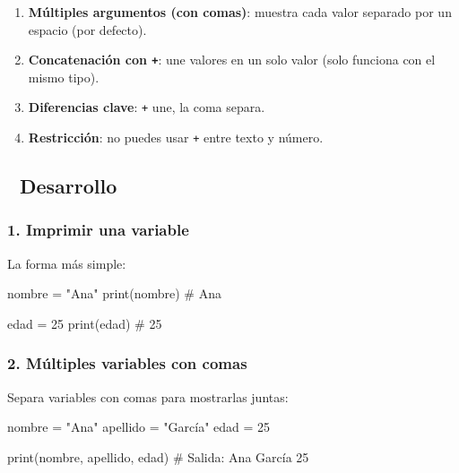 \documentclass[
  doc,
  floatsintext,
  longtable,
  a4paper,
  nolmodern,
  notxfonts,
  notimes,
  12pt,
  colorlinks=true,linkcolor=blue,citecolor=blue,urlcolor=blue]{apa7}
\newenvironment{Shaded}{\begin{snugshade}}{\end{snugshade}}
\newcommand{\BuiltInTok}[1]{\textcolor[rgb]{0.00,0.23,0.31}{#1}}
\newcommand{\CommentTok}[1]{\textcolor[rgb]{0.37,0.37,0.37}{#1}}
\newcommand{\DecValTok}[1]{\textcolor[rgb]{0.68,0.00,0.00}{#1}}
\newcommand{\NormalTok}[1]{\textcolor[rgb]{0.00,0.23,0.31}{#1}}
\newcommand{\OperatorTok}[1]{\textcolor[rgb]{0.37,0.37,0.37}{#1}}
\newcommand{\StringTok}[1]{\textcolor[rgb]{0.13,0.47,0.30}{#1}}
\providecommand{\tightlist}{%
  \setlength{\itemsep}{0pt}\setlength{\parskip}{0pt}}
\begin{document}
\begin{enumerate}
\def\labelenumi{\arabic{enumi}.}
\tightlist
\item
  \textbf{Múltiples argumentos (con comas)}: muestra cada valor separado
  por un espacio (por defecto).
\item
  \textbf{Concatenación con \texttt{+}}: une valores en un solo valor
  (solo funciona con el mismo tipo).
\item
  \textbf{Diferencias clave}: \texttt{+} une, la coma separa.
\item
  \textbf{Restricción}: no puedes usar \texttt{+} entre texto y número.
\end{enumerate}

\subsection{📐 Desarrollo}\label{desarrollo}

\subsubsection{1. Imprimir una variable}\label{imprimir-una-variable}

La forma más simple:

\begin{Shaded}
\begin{Highlighting}[]
\NormalTok{nombre }\OperatorTok{=} \StringTok{"Ana"}
\BuiltInTok{print}\NormalTok{(nombre)  }\CommentTok{\# Ana}

\NormalTok{edad }\OperatorTok{=} \DecValTok{25}
\BuiltInTok{print}\NormalTok{(edad)    }\CommentTok{\# 25}
\end{Highlighting}
\end{Shaded}

\subsubsection{2. Múltiples variables con
comas}\label{muxfaltiples-variables-con-comas}

Separa variables con comas para mostrarlas juntas:

\begin{Shaded}
\begin{Highlighting}[]
\NormalTok{nombre }\OperatorTok{=} \StringTok{"Ana"}
\NormalTok{apellido }\OperatorTok{=} \StringTok{"García"}
\NormalTok{edad }\OperatorTok{=} \DecValTok{25}

\BuiltInTok{print}\NormalTok{(nombre, apellido, edad)}
\CommentTok{\# Salida: Ana García 25}
\end{Highlighting}
\end{Shaded}
\end{document}
